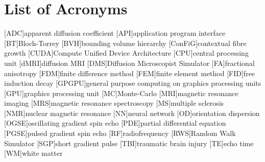 
\chapter*{List of Acronyms}

\makeatletter
\patchcmd{\AC@@acro}{] #3}{] \MakeUppercase #3}{}{}
\patchcmd{\AC@@acro}{] #3}{] \MakeUppercase #3}{}{}
\makeatother
\begin{acronym}
  [ADC]{apparent diffusion coefficient}
  [API]{application program interface}
  [BT]{Bloch-Torrey}
  [BVH]{bounding volume hierarchy}
  [ConFiG]{contextual fibre growth}
  [CUDA]{Compute Unified Device Architecture}
  [CPU]{central processing unit}
  [dMRI]{diffusion MRI}
  [DMS]{Diffusion Microscopist Simulator}
  [FA]{fractional anisotropy}
  [FDM]{finite difference method}
  [FEM]{finite element method}
  [FID]{free induction decay}
  [GPGPU]{general purpose computing on graphics processing units}
  [GPU]{graphics processing unit}
  [MC]{Monte-Carlo}
  [MRI]{magnetic resonance imaging}
  [MRS]{magnetic resonance spectroscopy}
  [MS]{multiple sclerosis}
  [NMR]{nuclear magnetic resonance}
  [NN]{neural network}
  [OD]{orientation dispersion}
  [OGSE]{oscillating gradient spin echo}
  [PDE]{partial differential equation}
  [PGSE]{pulsed gradient spin echo}
  [RF]{radiofrequency}
  [RWS]{Random Walk Simulator}
  [SGP]{short gradient pulse}
  [TBI]{traumatic brain injury}
  [TE]{echo time}
  [WM]{white matter}
\end{acronym}


